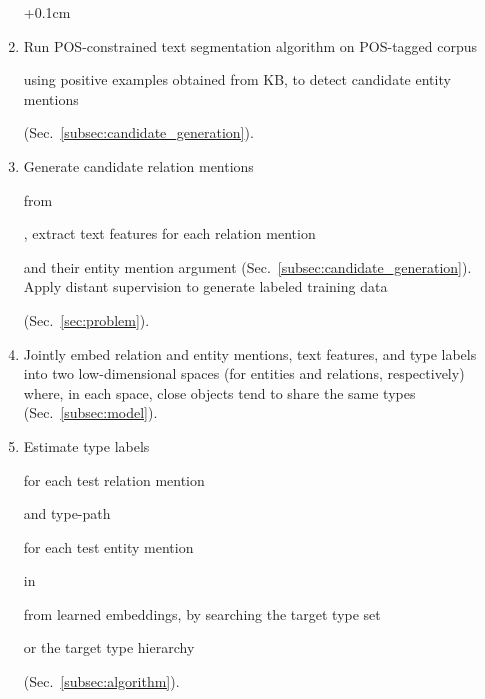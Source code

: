 \documentclass[letterpaper]{sig-alternate-2013}
\begin{document}
\begin{enumerate}[leftmargin=12pt]\itemsep+0.1cm
\item Run POS-constrained text segmentation algorithm on POS-tagged corpus \begin{small}\end{small} using positive examples obtained from KB, to detect candidate entity mentions \begin{small}\end{small} (Sec.~\ref{subsec:candidate_generation}). 

\item Generate candidate relation mentions \begin{small}\end{small} from \begin{small}\end{small}, extract text features for each relation mention \begin{small}\end{small} and their entity mention argument (Sec.~\ref{subsec:candidate_generation}). Apply distant supervision to generate labeled training data \begin{small}\end{small} (Sec.~\ref{sec:problem}).

\item Jointly embed relation and entity mentions, text features, and type labels into two low-dimensional spaces (for entities and relations, respectively) where, in each space, close objects tend to share the same types (Sec.~\ref{subsec:model}).

\item Estimate type labels \begin{small}\end{small} for each test relation mention \begin{small}\end{small} and type-path \begin{small}\end{small} for each test entity mention \begin{small} in \end{small} from learned embeddings, by searching the target type set \begin{small}\end{small} or the target type hierarchy \begin{small}\end{small} (Sec.~\ref{subsec:algorithm}).
\end{enumerate}
\end{document}
